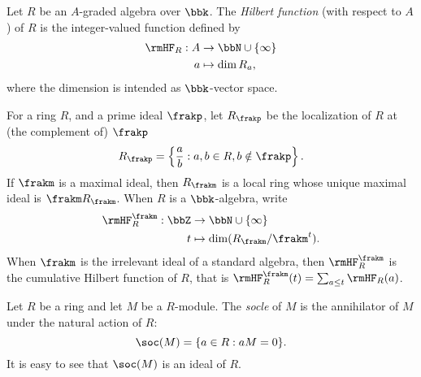\begin{definition}
\label{introduction-definition-hilbertfunction}
Let $R$ be an $A$-graded algebra over $\bbk$. The {\it Hilbert function} (with respect to $A$) of $R$ is the integer-valued function defined by 
\[
\begin{aligned}
\rmHF_R : A &\to \bbN \cup \{ \infty\} \\
a &\mapsto \dim R_a,
\end{aligned}
\]
where the dimension is intended as $\bbk$-vector space.
\end{definition}

For a ring $R$, and a prime ideal $\frakp$, let $R_{\frakp}$ be the localization of $R$ at (the complement of) $\frakp$
\[
 R_{\frakp} = \left\{ \frac{a}{b} : a,b \in R, b \notin \frakp \right\}.
\]
If $\frakm$ is a maximal ideal, then $R_{\frakm}$ is a local ring whose unique maximal ideal is $\frakm R_{\frakm}$. When $R$ is a $\bbk$-algebra, write 
\[
\begin{aligned}
\rmHF_R^{\frakm} : \bbZ &\to \bbN \cup \{ \infty\} \\
t &\mapsto \dim ( R_{\frakm} / \frakm^{t}). 
\end{aligned}
\]
When $\frakm$ is the irrelevant ideal of a standard algebra, then  $\rmHF_R^{\frakm}$ is the cumulative Hilbert function of $R$, that is $\rmHF_R^{\frakm}(t) = \sum_{a \leq t} \rmHF_R(a)$.


\begin{definition}
 \label{introduction-definition-socleandgorenstein}
Let $R$ be a ring and let $M$ be a $R$-module. The {\it socle} of $M$ is the annihilator of $M$ under the natural action of $R$:
\[
\soc(M) = \{ a \in R : aM = 0\}.
\]
It is easy to see that $\soc(M)$ is an ideal of $R$.
\end{definition}


